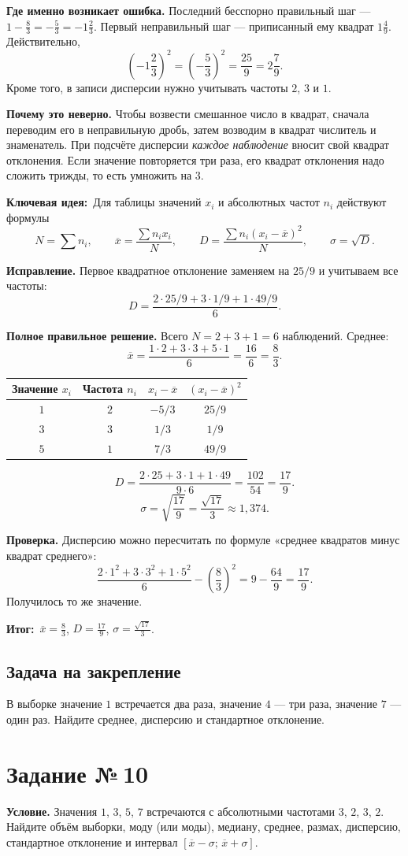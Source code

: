 \documentclass[a4paper,12pt]{article}
\newcommand{\key}{\textcolor{hint}{\textbf{Ключевая идея:}}}
\newcommand{\res}{\textcolor{accent}{\textbf{Итог:}}}
\newcommand{\tasktitle}[1]{\phantomsection\label{task:#1}\section*{Задание №\,#1}}
\begin{document}
\textbf{Где именно возникает ошибка.} Последний бесспорно правильный шаг --- $1-\frac83=-\frac53=-1\frac23$. Первый неправильный шаг --- приписанный ему квадрат $1\frac49$. Действительно,
\[
\left(-1\frac23\right)^2
=\left(-\frac53\right)^2
=\frac{25}{9}=2\frac79.
\]
Кроме того, в записи дисперсии нужно учитывать частоты $2$, $3$ и $1$.

\textbf{Почему это неверно.} Чтобы возвести смешанное число в квадрат, сначала переводим его в неправильную дробь, затем возводим в квадрат числитель и знаменатель. При подсчёте дисперсии \emph{каждое наблюдение} вносит свой квадрат отклонения. Если значение повторяется три раза, его квадрат отклонения надо сложить трижды, то есть умножить на $3$.

\key\ Для таблицы значений $x_i$ и абсолютных частот $n_i$ действуют формулы
\[
N=\sum n_i,\qquad
\overline{x}=\frac{\sum n_i x_i}{N},\qquad
D=\frac{\sum n_i(x_i-\overline{x})^2}{N},
\qquad \sigma=\sqrt D.
\]

\textbf{Исправление.} Первое квадратное отклонение заменяем на $25/9$ и учитываем все частоты:
\[
D=\frac{2\cdot25/9+3\cdot1/9+1\cdot49/9}{6}.
\]

\textbf{Полное правильное решение.} Всего $N=2+3+1=6$ наблюдений. Среднее:
\[
\overline{x}=\frac{1\cdot2+3\cdot3+5\cdot1}{6}
=\frac{16}{6}=\frac83.
\]
\begin{center}
\renewcommand{\arraystretch}{1.3}
\begin{tabular}{@{}c c c c@{}}
\toprule
Значение $x_i$ & Частота $n_i$ & $x_i-\overline{x}$ & $(x_i-\overline{x})^2$\\
\midrule
$1$ & $2$ & $-5/3$ & $25/9$\\
$3$ & $3$ & $1/3$ & $1/9$\\
$5$ & $1$ & $7/3$ & $49/9$\\
\bottomrule
\end{tabular}
\end{center}
\[
D=\frac{2\cdot25+3\cdot1+1\cdot49}{9\cdot6}
=\frac{102}{54}=\boxed{\frac{17}{9}}.
\]
\[
\sigma=\sqrt{\frac{17}{9}}=\boxed{\frac{\sqrt{17}}3}\approx1{,}374.
\]

\textbf{Проверка.} Дисперсию можно пересчитать по формуле «среднее квадратов минус квадрат среднего»:
\[
\frac{2\cdot1^2+3\cdot3^2+1\cdot5^2}{6}
-\left(\frac83\right)^2
=9-\frac{64}{9}=\frac{17}{9}.
\]
Получилось то же значение.

\res\ $\overline{x}=\frac83$, $D=\frac{17}{9}$, $\sigma=\frac{\sqrt{17}}3$.

\subsection*{Задача на закрепление}
В выборке значение $1$ встречается два раза, значение $4$ --- три раза, значение $7$ --- один раз. Найдите среднее, дисперсию и стандартное отклонение.
\newpage
\tasktitle{10}
\textbf{Условие.} Значения $1$, $3$, $5$, $7$ встречаются с абсолютными частотами $3$, $2$, $3$, $2$. Найдите объём выборки, моду (или моды), медиану, среднее, размах, дисперсию, стандартное отклонение и интервал $[\overline{x}-\sigma;\,\overline{x}+\sigma]$.
\end{document}
